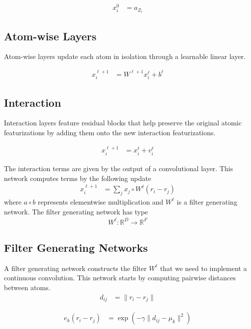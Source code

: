 \documentclass[book.tex]{subfiles}
\begin{document}
\begin{align}
x_i^0 &= a_{Z_i}
\end{align}

\subsection{Atom-wise Layers}

Atom-wise layers update each atom in isolation through a learnable linear layer.

\begin{align}
x^{\ell + 1}_i &= W^{\ell+1}x^\ell_i + b^\ell
\end{align}

\subsection{Interaction}

Interaction layers feature residual blocks that help preserve the original atomic featurizations by adding them onto the new interaction featurizations.

\begin{align}
x^{\ell + 1}_i &= x^\ell_i + v^\ell_i
\end{align}

The interaction terms are given by the output of a convolutional layer. This network computes terms by the following update
\begin{align}
x^{\ell+1}_{i} &= \sum_j x_j \circ W^\ell(r_i - r_j)
\end{align}
where $a \circ b$ represents elementwise multiplication and $W^\ell$ is a filter generating network. The filter generating network has type
\begin{align}
W^\ell: \mathbb{R}^D \to \mathbb{R}^F
\end{align}

\subsection{Filter Generating Networks}
A filter generating network constructs the filter $W^\ell$ that we need to implement a continuous convolution. This network starts by computing pairwise distances between atoms.
\begin{align}
d_{ij} &= \|r_i - r_j\|
\end{align}

\begin{align}
e_k(r_i - r_j) &= \exp(-\gamma \|d_{ij} - \mu_k\|^2)
\end{align}
\end{document}
